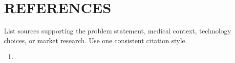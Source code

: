 \section{REFERENCES}

List sources supporting the problem statement, medical context, technology choices, or market research. Use one consistent citation style.
\begin{enumerate}
    \item {}
\end{enumerate}
